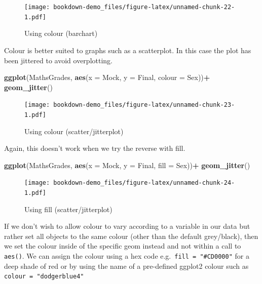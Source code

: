 \documentclass[
]{book}
\newenvironment{Shaded}{\begin{snugshade}}{\end{snugshade}}
\newcommand{\DataTypeTok}[1]{\textcolor[rgb]{0.13,0.29,0.53}{#1}}
\newcommand{\KeywordTok}[1]{\textcolor[rgb]{0.13,0.29,0.53}{\textbf{#1}}}
\newcommand{\NormalTok}[1]{#1}
\newcommand{\OperatorTok}[1]{\textcolor[rgb]{0.81,0.36,0.00}{\textbf{#1}}}
\newcommand{\StringTok}[1]{\textcolor[rgb]{0.31,0.60,0.02}{#1}}
\begin{document}
\begin{figure}
\centering
\texttt{[image: bookdown-demo\_files/figure-latex/unnamed-chunk-22-1.pdf]}
\caption{\label{fig:unnamed-chunk-22}Using colour (barchart)}
\end{figure}

Colour is better suited to graphs such as a scatterplot. In this case the plot has been jittered to avoid overplotting.

\begin{Shaded}
\begin{Highlighting}[]
\KeywordTok{ggplot}\NormalTok{(MathsGrades, }\KeywordTok{aes}\NormalTok{(}\DataTypeTok{x =}\NormalTok{ Mock, }\DataTypeTok{y =}\NormalTok{ Final, }\DataTypeTok{colour =}\NormalTok{ Sex))}\OperatorTok{+}
\StringTok{  }\KeywordTok{geom_jitter}\NormalTok{()}
\end{Highlighting}
\end{Shaded}

\begin{figure}
\centering
\texttt{[image: bookdown-demo\_files/figure-latex/unnamed-chunk-23-1.pdf]}
\caption{\label{fig:unnamed-chunk-23}Using colour (scatter/jitterplot)}
\end{figure}

Again, this doesn't work when we try the reverse with fill.

\begin{Shaded}
\begin{Highlighting}[]
\KeywordTok{ggplot}\NormalTok{(MathsGrades, }\KeywordTok{aes}\NormalTok{(}\DataTypeTok{x =}\NormalTok{ Mock, }\DataTypeTok{y =}\NormalTok{ Final, }\DataTypeTok{fill =}\NormalTok{ Sex))}\OperatorTok{+}
\StringTok{  }\KeywordTok{geom_jitter}\NormalTok{()}
\end{Highlighting}
\end{Shaded}

\begin{figure}
\centering
\texttt{[image: bookdown-demo\_files/figure-latex/unnamed-chunk-24-1.pdf]}
\caption{\label{fig:unnamed-chunk-24}Using fill (scatter/jitterplot)}
\end{figure}

If we don't wish to allow colour to vary according to a variable in our data but rather set all objects to the same colour (other than the default grey/black), then we set the colour inside of the specific geom instead and not within a call to \texttt{aes()}. We can assign the colour using a hex code e.g.~\texttt{fill\ =\ "\#CD0000"} for a deep shade of red or by using the name of a pre-defined ggplot2 colour such as \texttt{colour\ =\ "dodgerblue4"}
\end{document}
